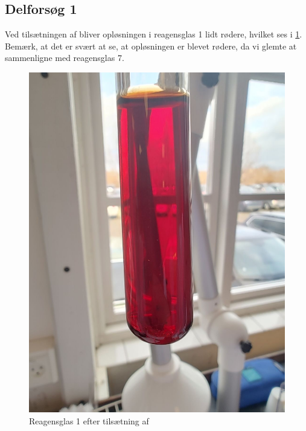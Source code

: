 \documentclass{report}
\begin{document}
\subsection*{Delforsøg 1}
Ved tilsætningen af  bliver opløsningen i reagensglas 1 lidt rødere, hvilket ses i \cref{fig:for1}.
Bemærk, at det er svært at se, at opløsningen er blevet rødere, da vi glemte at sammenligne med reagensglas 7.
\begin{figure}[H]
\begin{center}
  \includegraphics[scale=0.25]{for1.jpeg}
\end{center}
  \caption{Reagensglas 1 efter tilsætning af }
\label{fig:for1}
\end{figure}
\end{document}
